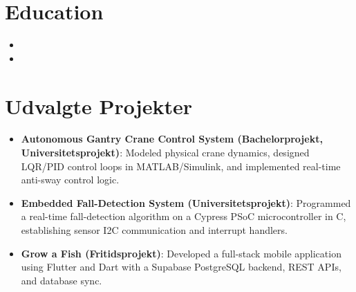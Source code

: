 \documentclass[11pt,a4paper,sans]{moderncv}
\begin{document}
\section{Education}
\vspace{1pt}
\begin{itemize}

\item{}

\vspace{3pt}

\item{}

\end{itemize}


\section{Udvalgte Projekter}
\vspace{1pt}
\begin{itemize}

\item{\textbf{Autonomous Gantry Crane Control System (Bachelorprojekt, Universitetsprojekt)}: Modeled physical crane dynamics, designed LQR/PID control loops in MATLAB/Simulink, and implemented real-time anti-sway control logic.}

\item{\textbf{Embedded Fall-Detection System (Universitetsprojekt)}: Programmed a real-time fall-detection algorithm on a Cypress PSoC microcontroller in C, establishing sensor I2C communication and interrupt handlers.}

\item{\textbf{Grow a Fish (Fritidsprojekt)}: Developed a full-stack mobile application using Flutter and Dart with a Supabase PostgreSQL backend, REST APIs, and database sync.}

\end{itemize}
\end{document}
